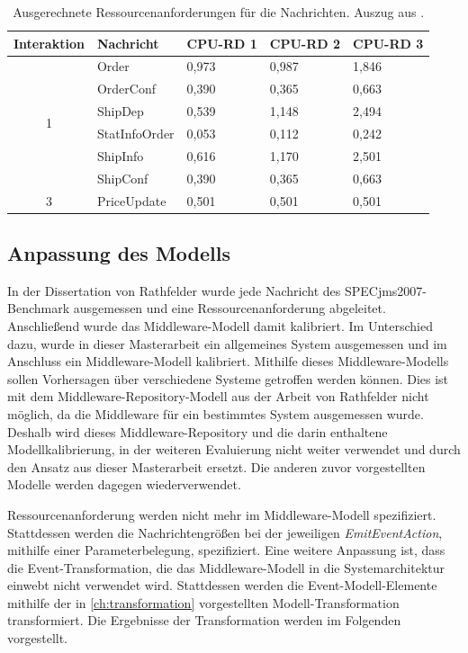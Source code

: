 \begin{table}
\center
  \begin{tabular}{|c|l|l|l|l|}
  \hline
    \textbf{Interaktion} & \textbf{Nachricht} & \textbf{CPU-RD 1} & \textbf{CPU-RD 2} &\textbf{CPU-RD 3} \\
    \hline \hline
    \multirow{6}{*}{1} & Order & 0,973 & 0,987 & 1,846 \\\cline{2-5}
    & OrderConf & 0,390 & 0,365 & 0,663 \\\cline{2-5}
    & ShipDep & 0,539 & 1,148 & 2,494\\\cline{2-5}
    & StatInfoOrder & 0,053 & 0,112 & 0,242 \\\cline{2-5}
    & ShipInfo & 0,616 & 1,170 & 2,501 \\\cline{2-5}
    & ShipConf & 0,390 & 0,365 & 0,663  \\\hline
    \hline
     3 & PriceUpdate & 0,501 & 0,501 & 0,501 \\\hline
  \end{tabular}
	\caption{\label{tab:specjmsMsgSizeRd} Ausgerechnete Ressourcenanforderungen für die Nachrichten. Auszug aus \cite{Rathfelder2013}.}
\end{table}



\subsection{Anpassung des Modells}
In der Dissertation von Rathfelder \cite{Rathfelder2013} wurde jede Nachricht des SPECjms2007-Benchmark ausgemessen und eine Ressourcenanforderung abgeleitet. Anschließend wurde das Middleware-Modell damit kalibriert. Im Unterschied dazu, wurde in dieser Masterarbeit ein allgemeines System ausgemessen und im Anschluss ein Middleware-Modell kalibriert. Mithilfe dieses Middleware-Modells sollen Vorhersagen über verschiedene Systeme getroffen werden können. Dies ist mit dem Middleware-Repository-Modell aus der Arbeit von Rathfelder nicht möglich, da die Middleware für ein bestimmtes System ausgemessen wurde. Deshalb wird dieses Middleware-Repository und die darin enthaltene Modellkalibrierung, in der weiteren Evaluierung nicht weiter verwendet und durch den Ansatz aus dieser Masterarbeit ersetzt. 
Die anderen zuvor vorgestellten Modelle werden dagegen wiederverwendet. \par
Ressourcenanforderung werden nicht mehr im Middleware-Modell spezifiziert. Stattdessen werden die Nachrichtengrößen bei der jeweiligen \emph{EmitEventAction}, mithilfe einer Parameterbelegung, spezifiziert. Eine weitere Anpassung ist, dass die Event-Transformation, die das Middleware-Modell in die Systemarchitektur einwebt nicht verwendet wird. Stattdessen werden die Event-Modell-Elemente mithilfe der in \autoref{ch:transformation} vorgestellten Modell-Transformation transformiert. Die Ergebnisse der Transformation werden im Folgenden vorgestellt.



